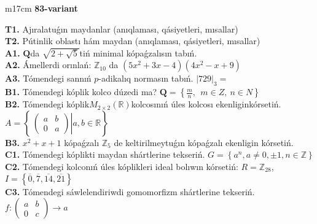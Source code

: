 \documentclass{article}
\begin{document}
\begin{tabular}{m{17cm}}
\textbf{83-variant}
\newline

\textbf{T1.} Ajıralatuǵın maydanlar (anıqlaması, qásiyetleri, mısallar) \\
\textbf{T2.} Pútinlik oblastı hám maydan (anıqlaması, qásiyetleri, mısallar) \\
\textbf{A1.} \(\mathbf{Q}\)da \(\sqrt{2 + \sqrt{5}}\)tiń minimal kópaǵzalısın tabıń. \\
\textbf{A2.} Ámellerdi orınlań: \(\mathbb{Z}_{10}\) da \(\left( 5x^{2} + 3x - 4 \right)\left( 4x^{2} - x + 9 \right)\) \\
\textbf{A3.} Tómendegi sannıń \(p\)-adikalıq normasın tabıń. \(|729|_{3} =\) \\
\textbf{B1.} Tómendegi kóplik kolco dúzedi ma? \(\mathbf{Q} = \left\{ \frac{m}{n},\ \ m \in Z,\ n \in N \right\}\) \\
\textbf{B2.} Tómendegi kóplik\(M_{2 \times 2}\left( \mathbb{R} \right)\)kolcosınıń úles kolcosı ekenliginkórsetiń. \(A = \left\{ \left. \ \begin{pmatrix}
a & b \\
0 & a
\end{pmatrix} \right|a,b\mathbb{\in R} \right\}\) \\
\textbf{B3.} \(x^{2} + x + 1\) kópaǵzalı \(\mathbb{Z}_{5}\) de keltirilmeytuǵın kópaǵzalı ekenligin kórsetiń. \\
\textbf{C1.} Tómendegi kóplikti maydan shártlerine tekseriń. \(G = \left\{ a^{n},a \neq 0, \pm 1,n \in \mathbb{Z} \right\}\) \\
\textbf{C2.} Tómendegi kolconıń úles kóplikleri ideal bolıwın kórsetiń:
\(R = \mathbb{Z}_{28}\), \(I = \left\{ \overline{0},\overline{7},\overline{14},\overline{21} \right\}\) \\
\textbf{C3.} Tómendegi sáwlelendiriwdi gomomorfizm shártlerine tekseriń. \(f:\begin{pmatrix}
a & b \\
0 & c
\end{pmatrix} \rightarrow a\) \\

\end{tabular}
\vspace{1cm}
\end{document}

